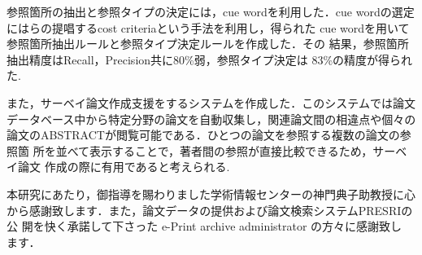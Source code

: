 参照箇所の抽出と参照タイプの決定には，cue wordを利用した．cue wordの選定
には\cite{Kita94}らの提唱するcost criteriaという手法を利用し，得られた
cue wordを用いて参照箇所抽出ルールと参照タイプ決定ルールを作成した．その
結果，参照箇所抽出精度はRecall，Precision共に80\%弱，参照タイプ決定は
83\%の精度が得られた.

また，サーベイ論文作成支援をするシステムを作成した．このシステムでは論文
データベース中から特定分野の論文を自動収集し，関連論文間の相違点や個々の
論文のABSTRACTが閲覧可能である．ひとつの論文を参照する複数の論文の参照箇
所を並べて表示することで，著者間の参照が直接比較できるため，サーベイ論文
作成の際に有用であると考えられる.

\bigskip

\acknowledgment

本研究にあたり，御指導を賜わりました学術情報センターの神門典子助教授に心
から感謝致します．また，論文データの提供および論文検索システムPRESRIの公
開を快く承諾して下さった e-Print archive administrator の方々に感謝致し
ます．








\begin{biography}



\end{biography}


